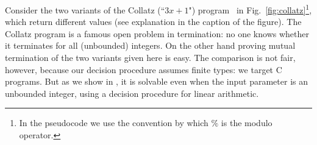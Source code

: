 \begin{example} \label{ex:collatz} Consider the two variants of the Collatz (``$3x + 1$") program~\cite{G81} in Fig.~\ref{fig:collatz}\footnote{In the pseudocode we use the convention by which $\%$ is the modulo operator. }, which return different values (see explanation in the caption of the figure).
The Collatz program is a famous open problem in termination: no one knows whether
it terminates for all (unbounded) integers. On
the other hand proving mutual termination of the two variants given here is
easy. The comparison is not fair, however, because our decision procedure assumes finite types: we target C programs.
But as we show in , it is solvable even when the input parameter is an unbounded integer, using a decision procedure for linear arithmetic.



\end{example}
